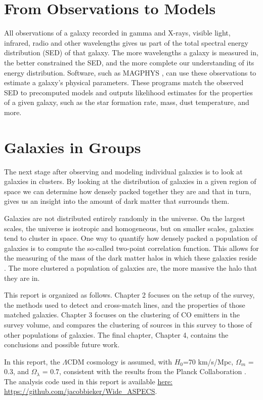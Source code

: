 \documentclass[twoside,single]{lion-msc}
\begin{document}
\section{From Observations to Models}

All observations of a galaxy recorded in gamma and X-rays, visible light, infrared, radio and other wavelengths gives us part of the total spectral energy distribution (SED) of that galaxy. The more wavelengths a galaxy is measured in, the better constrained the SED, and the more complete our understanding of its energy distribution. Software, such as MAGPHYS \cite{da2008simple, da2015alma}, can use these observations to estimate a galaxy's physical parameters. These programs match the observed SED to precomputed models and outputs likelihood estimates for the properties of a given galaxy, such as the star formation rate, mass, dust temperature, and more.

\section{Galaxies in Groups}

The next stage after observing and modeling individual galaxies is to look at galaxies in clusters. By looking at the distribution of galaxies in a given region of space we can determine how densely packed together they are and that in turn, gives us an insight into the amount of dark matter that surrounds them.

Galaxies are not distributed entirely randomly in the universe. On the largest scales, the universe is isotropic and homogeneous, but on smaller scales, galaxies tend to cluster in space. One way to quantify how densely packed a population of galaxies is to compute the so-called two-point correlation function. This allows for the measuring of the mass of the dark matter halos in which these galaxies reside \cite{hickox2011clustering}. The more clustered a population of galaxies are, the more massive the halo that they are in.

This report is organized as follows. Chapter 2 focuses on the setup of the survey, the methods used to detect and cross-match lines, and the properties of those matched galaxies. Chapter 3 focuses on the clustering of CO emitters in the survey volume, and compares the clustering of sources in this survey to those of other populations of galaxies. The final chapter, Chapter 4, contains the conclusions and possible future work. 

In this report, the $\Lambda$CDM cosmology is assumed, with $H_0$=70 km/s/Mpc, $\Omega_m$ = 0.3, and $\Omega_{\lambda}$ = 0.7, consistent with the results from the Planck Collaboration \cite{ade2016planck}. The analysis code used in this report is available \href{https://github.com/jacobbieker/Wide\_ASPECS}{here: https://github.com/jacobbieker/Wide\_ASPECS}. 
\end{document}
